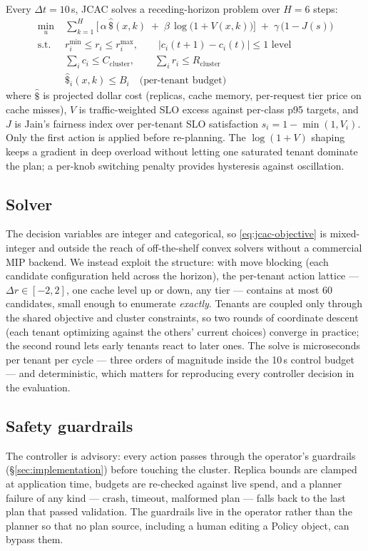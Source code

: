Every $\Delta t = 10$\,s, JCAC solves a receding-horizon problem over
$H = 6$ steps:
\begin{align}
\min_{u}\;& \sum_{k=1}^{H}\Big[\,\alpha\,\widehat{\$}(x, k)
  \;+\; \beta\,\log\!\big(1 + V(x, k)\big)\Big]
  \;+\; \gamma\,\big(1 - J(s)\big) \label{eq:jcac-objective}\\
\text{s.t.}\;\;
& r^{\min}_i \le r_i \le r^{\max}_i, \qquad
  |c_i(t{+}1) - c_i(t)| \le 1 \text{ level} \nonumber\\
& \textstyle\sum_i c_i \le C_{\text{cluster}}, \qquad
  \textstyle\sum_i r_i \le R_{\text{cluster}} \nonumber\\
& \widehat{\$}_i(x,k) \le B_i \quad \text{(per-tenant budget)} \nonumber
\end{align}
where $\widehat{\$}$ is projected dollar cost (replicas, cache memory,
per-request tier price on cache misses), $V$ is traffic-weighted SLO
excess against per-class p95 targets, and $J$ is Jain's fairness index
over per-tenant SLO satisfaction $s_i = 1 - \min(1, V_i)$. Only the first
action is applied before re-planning. The $\log(1+V)$ shaping keeps a
gradient in deep overload without letting one saturated tenant dominate
the plan; a per-knob switching penalty provides hysteresis against
oscillation.

\subsection{Solver}
The decision variables are integer and categorical, so
\eqref{eq:jcac-objective} is mixed-integer and outside the reach of
off-the-shelf convex solvers without a commercial MIP backend. We instead
exploit the structure: with move blocking (each candidate configuration
held across the horizon), the per-tenant action lattice ---
$\Delta r \in [-2, 2]$, one cache level up or down, any tier --- contains
at most 60 candidates, small enough to enumerate \emph{exactly}. Tenants
are coupled only through the shared objective and cluster constraints, so
two rounds of coordinate descent (each tenant optimizing against the
others' current choices) converge in practice; the second round lets
early tenants react to later ones. The solve is microseconds per tenant
per cycle --- three orders of magnitude inside the 10\,s control budget ---
and deterministic, which matters for reproducing every controller decision
in the evaluation.

\subsection{Safety guardrails}
The controller is advisory: every action passes through the operator's
guardrails (\S\ref{sec:implementation}) before touching the cluster.
Replica bounds are clamped at application time, budgets are re-checked
against live spend, and a planner failure of any kind --- crash, timeout,
malformed plan --- falls back to the last plan that passed validation.
The guardrails live in the operator rather than the planner so that no
plan source, including a human editing a Policy object, can bypass them.

